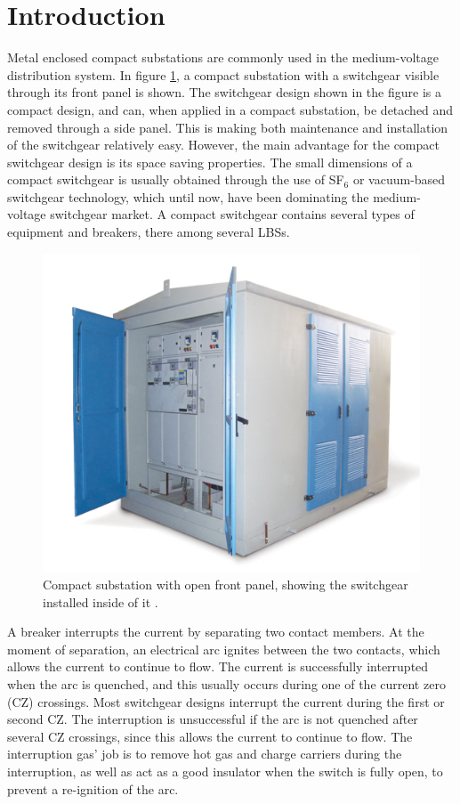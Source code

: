 \documentclass[10pt,b5paper,twoside]{article}
\begin{document}
\cleardoublepage
\section{Introduction}
Metal enclosed compact substations are commonly used in the medium-voltage distribution system. In figure \ref{fig:compactSubstation}, a compact substation with a switchgear visible through its front panel is shown. The switchgear design shown in the figure is a compact design, and can, when applied in a compact substation, be detached and removed through a side panel. This is making both maintenance and installation of the switchgear relatively easy. However, the main advantage for the compact switchgear design is its space saving properties. The small dimensions of a compact switchgear is usually obtained through the use of SF$_6$ or vacuum-based switchgear technology, which until now, have been dominating the medium-voltage switchgear market. A compact switchgear contains several types of equipment and breakers, there among several LBSs. 

\begin{figure} [h]
\centering
\includegraphics[scale=0.5]{Bilder/Introduction/general_substation.jpg}
\caption{Compact substation with open front panel, showing the switchgear installed inside of it \cite{bib:comSub}.} \label{fig:compactSubstation}
\end{figure}

A breaker interrupts the current by separating two contact members. At the moment of separation, an electrical arc ignites between the two contacts, which allows the current to continue to flow. The current is successfully interrupted when the arc is quenched, and this usually occurs during one of the current zero (CZ) crossings. Most switchgear designs interrupt the current during the first or second CZ. The interruption is unsuccessful if the arc is not quenched after several CZ crossings, since this allows the current to continue to flow. The interruption gas' job is to remove hot gas and charge carriers during the interruption, as well as act as a good insulator when the switch is fully open, to prevent a re-ignition of the arc.
\end{document}
